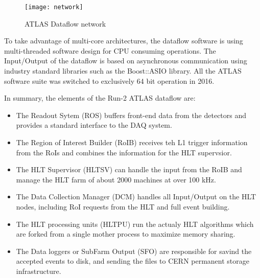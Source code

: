 \begin{figure}[t!]
\centering
\texttt{[image: network]} 
\vspace{-1cm}
\caption{ATLAS Dataflow network}
\label{fig:net_diagram}
\end{figure} 

To take advantage of multi-core architectures, the dataflow
 software is using multi-threaded software design for CPU consuming operations.
The Input/Output of the dataflow is based on asynchronous communication using industry standard libraries
such as the Boost::ASIO library. All the ATLAS software suite was switched to exclusively 64 bit operation in 2016.



In summary, the elements of the Run-2 ATLAS dataflow are:

\begin{itemize}
\item The Readout Sytem (ROS) buffers front-end data from the detectors and provides a standard interface to the DAQ system.
\item The Region of Interest Builder (RoIB) receives teh L1 trigger information from the RoIs and combines the information for the HLT supervsior.
\item The HLT Supervisor (HLTSV) can handle the input from the RoIB and manage the HLT farm of about 2000 machines at over 100 kHz.
\item The Data Collection Manager (DCM) handles all Input/Output on the HLT nodes, including RoI requests from the HLT and full event building.
\item The HLT processing units (HLTPU) run the actualy HLT algorithms which 
are forked from a single mother process to maximize memory sharing.
\item The Data loggers or SubFarm Output (SFO) are responsible for savind the 
accepted events to disk, and sending the files to CERN permanent storage infrastructure.
\end{itemize}



